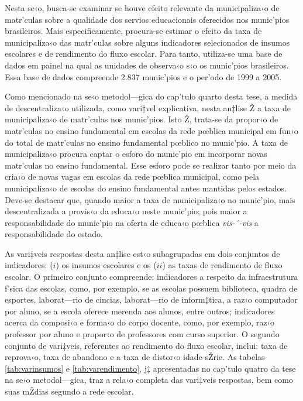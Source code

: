 \documentclass[a4paper, 12pt]{article}
\begin{document}
Nesta se‹o, busca-se examinar se houve efeito relevante da municipaliza‹o de matr’culas sobre a qualidade dos servios educacionais oferecidos nos munic’pios brasileiros. Mais especificamente, procura-se estimar o efeito da taxa de municipaliza‹o das matr’culas sobre alguns indicadores selecionados de insumos escolares e de rendimento do fluxo escolar. Para tanto, utiliza-se uma base de dados em painel na qual as unidades de observa‹o s‹o os munic’pios brasileiros. Essa base de dados compreende 2.837 munic’pios e o per’odo de 1999 a 2005.

Como mencionado na se‹o metodol—gica do cap’tulo quarto desta tese, a medida de descentraliza‹o utilizada, como vari‡vel explicativa, nesta an‡lise Ž a taxa de municipaliza‹o de matr’culas nos munic’pios. Isto Ž, trata-se da propor‹o de matr’culas no ensino fundamental em escolas da rede pœblica municipal em fun‹o do total de matr’culas no ensino fundamental pœblico no munic’pio. A taxa de municipaliza‹o procura captar o esforo do munic’pio em incorporar novas matr’culas no ensino fundamental. Esse esforo pode se realizar tanto por meio da cria‹o de novas vagas em escolas da rede pœblica municipal, como pela municipaliza‹o de escolas do ensino fundamental antes mantidas pelos estados. Deve-se destacar que, quando maior a taxa de municipaliza‹o no munic’pio, mais descentralizada a provis‹o da educa‹o neste munic’pio; pois maior a responsabilidade do munic’pio na oferta de educa‹o pœblica \emph{vis-ˆ-vis} a responsabilidade do estado.

As vari‡veis respostas desta an‡lise est‹o subagrupadas em dois conjuntos de indicadores: ($i$) os insumos escolares e os ($ii$) as taxas de rendimento de fluxo escolar. O primeiro conjunto compreende: indicadores a respeito da infraestrutura f’sica das escolas, como, por exemplo, se as escolas possuem biblioteca, quadra de esportes, laborat—rio de cincias, laborat—rio de inform‡tica, a raz‹o computador por aluno, se a escola oferece merenda aos alunos, entre outros; indicadores acerca da composi‹o e forma‹o do corpo docente, como, por exemplo, raz‹o professor por aluno e propor‹o de professores com curso superior. O segundo conjunto de vari‡veis, referentes ao rendimento do fluxo escolar, inclui: taxa de reprova‹o, taxa de abandono e a taxa de distor‹o idade-sŽrie. As tabelas \ref{tab:varinsumos} e \ref{tab:varendimento}, j‡ apresentadas no cap’tulo quatro da tese na se‹o metodol—gica, traz a rela‹o completa das vari‡veis respostas, bem como suas mŽdias segundo a rede escolar.
\end{document}
